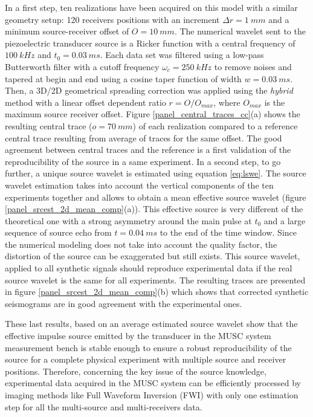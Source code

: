 \documentclass[manuscript,revised]{geophysics}
\begin{document}
\noindent In a first step, ten realizations have been acquired on this model with a similar geometry setup: 120 receivers positions with an increment $\Delta r= 1\ mm$ and a minimum source-receiver offset of $O=10\ mm$. The numerical wavelet sent to the piezoelectric transducer source is a Ricker function with a central frequency of $100\ kHz$ and $t_{0}=0.03\ ms$. Each data set was filtered using a low-pass Butterworth filter with a cutoff frequency $\omega_{c}=250\ kHz$ to remove noises and tapered at begin and end using a cosine taper function of width $w=0.03\ ms$. Then, a 3D/2D geometrical spreading correction was applied using the \textit{hybrid} method with a linear offset dependent ratio $r=O/O_{max}$, where $O_{max}$ is the maximum source receiver offset. Figure \ref{panel_central_traces_cc}(a) shows the resulting central trace ($o=70\ mm$) of each realization compared to a reference central trace resulting from average of traces for the same offset. The good agreement between central traces and the reference is a first validation of the reproducibility of the source in a same experiment. In a second step, to go further, a unique source wavelet is estimated using equation \ref{eq:lswe}. The source wavelet estimation takes into account the vertical components of the ten experiments together and allows to obtain a mean effective source wavelet (figure \ref{panel_srcest_2d_mean_comp}(a)). This effective source is very different of the theoretical one with a strong asymmetry around the main pulse at $t_{0}$ and a large sequence of source echo from $t=0.04\ ms$ to the end of the time window. Since the numerical modeling does not take into account the quality factor, the distortion of the source can be exaggerated but still exists. This source wavelet, applied to all synthetic signals should reproduce experimental data if the real source wavelet is the same for all experiments. The resulting traces are presented in figure \ref{panel_srcest_2d_mean_comp}(b) which shows that corrected synthetic seismograms are in good agreement with the experimental ones. %

\noindent These last results, based on an average estimated source wavelet show that the effective impulse source emitted by the transducer in the MUSC system measurement bench is stable enough to ensure a robust reproducibility of the source for a complete physical experiment with multiple source and receiver positions. Therefore, concerning the key issue of the source knowledge, experimental data acquired in the MUSC system can be efficiently processed by imaging methods like Full Waveform Inversion (FWI) with only one estimation step for all the multi-source and multi-receivers data.
\end{document}

